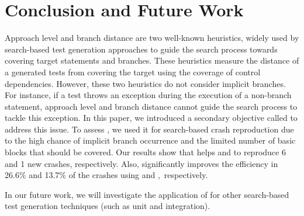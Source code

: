 \section{Conclusion and Future Work} 
\label{sec:bbc:confut}

Approach level and branch distance are two well-known heuristics, widely used by search-based test generation approaches to guide the search process towards covering target statements and branches. These heuristics measure the distance of a generated tests from covering the target using the coverage of control dependencies. However, these two heuristics do not consider implicit branches. For instance, if a test throws an exception during the execution of a non-branch statement, approach level and branch distance cannot guide the search process to tackle this exception. In this paper, we introduced a secondary objective called \bbc to address this issue. To assess \bbc, we used it for search-based crash reproduction due to the high chance of implicit branch occurrence and the limited number of basic blocks that should be covered.
Our results show that \bbc helps \integ and \WS to reproduce 6 and 1 new crashes, respectively.
Also, \bbc significantly improves the efficiency in 26.6\% and 13.7\% of the crashes using \integ and \WS,~respectively.

In our future work, we will investigate the application of \bbc for other search-based test generation techniques (such as unit and  integration).